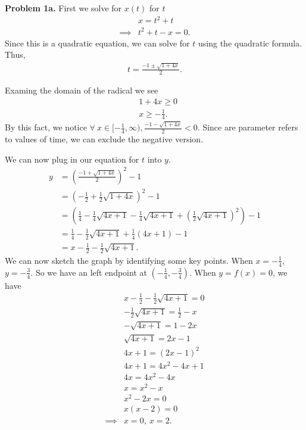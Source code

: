 \documentclass{report}
\begin{document}
    \bigbreak \noindent 
    \textbf{Problem 1a.} First we solve for $x(t)$ for $t$
    \begin{align*}
        &x = t^{2}+t \\
        \implies &t^{2}+t-x = 0
    .\end{align*}
    Since this is a quadratic equation, we can solve for $t$ using the quadratic formula. Thus,
    \bigbreak \noindent 
    \begin{align*}
        t = \frac{-1\pm\sqrt{1+4x}}{2}
    .\end{align*}
    \bigbreak \noindent 
    \begin{remark}
        Examing the domain of the radical we see
        \begin{align*}
            &1+4x \geq 0 \\
            &x \geq -\frac{1}{4}
        .\end{align*}
        By this fact, we notice $\forall\ x \in [-\frac{1}{4}, \infty), \frac{-1-\sqrt{1+4x}}{2} < 0$. Since are parameter refers to values of time, we can exclude the negative version. 
    \end{remark}
    \bigbreak \noindent 
    We can now plug in our equation for $t$ into $y$.
    \begin{align*}
        y &= \left(\frac{-1+\sqrt{1+4x}}{2}\right)^{2} - 1 \\
          &= \left(-\frac{1}{2}+\frac{1}{2}\sqrt{1+4x}\right)^{2} - 1 \\
          &=\left(\frac{1}{4}-\frac{1}{4}\sqrt{4x+1}-\frac{1}{4}\sqrt{4x+1}+\left(\frac{1}{2}\sqrt{4x+1}\right)^{2}\right) - 1 \\
          &=\frac{1}{4}-\frac{1}{2}\sqrt{4x+1}+\frac{1}{4}(4x+1)-1 \\
          &=x-\frac{1}{2}-\frac{1}{2}\sqrt{4x+1}
    .\end{align*}
    \pagebreak \bigbreak \noindent 
    We can now sketch the graph by identifying some key points. When $x=-\frac{1}{4}$, $y=-\frac{3}{4}$. So we have an left endpoint at $\left(-\frac{1}{4}, -\frac{3}{4}\right)$. When $y = f(x) = 0$, we have
    \begin{align*}
        &x-\frac{1}{2}-\frac{1}{2}\sqrt{4x+1} = 0 \\
        &-\frac{1}{2}\sqrt{4x+1} = \frac{1}{2}-x \\
        &-\sqrt{4x+1} = 1-2x \\
        &\sqrt{4x+1} = 2x-1 \\
        &4x+1 = (2x-1)^{2} \\
        &4x+1= 4x^{2}-4x+1 \\
        &4x = 4x^{2}-4x \\
        &x = x^{2}-x \\
        &x^{2}-2x = 0 \\
        &x(x-2) = 0 \\
        \implies &x=0,\ x=2
    .\end{align*}
\end{document}
